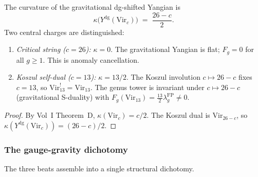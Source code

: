 \begin{proposition}
\label{prop:grav-yangian-curvature}
The curvature of the gravitational dg-shifted Yangian is
\begin{equation}\label{eq:grav-yangian-kappa}
\kappa\bigl(Y^{\mathrm{dg}}(\mathrm{Vir}_c)\bigr)
\;=\;
\frac{26 - c}{2}.
\end{equation}
Two central charges are distinguished:
\begin{enumerate}[label=\textup{(\roman*)}]
\item \emph{Critical string ($c = 26$):}\enspace
$\kappa = 0$. The gravitational Yangian is flat; $F_g = 0$ for all
$g \ge 1$. This is anomaly cancellation.

\item \emph{Koszul self-dual ($c = 13$):}\enspace
$\kappa = 13/2$. The Koszul involution $c \mapsto 26-c$ fixes
$c = 13$, so $\mathrm{Vir}_{13}^! = \mathrm{Vir}_{13}$.
The genus tower is invariant under $c \mapsto 26 - c$
\textup{(}gravitational S-duality\textup{)} with
$F_g(\mathrm{Vir}_{13}) = \frac{13}{2}\lambda_g^{\mathrm{FP}}\neq 0$.
\end{enumerate}
\end{proposition}

\begin{proof}
By Vol~I Theorem~D, $\kappa(\mathrm{Vir}_c) = c/2$. The Koszul
dual is $\mathrm{Vir}_{26-c}$, so
$\kappa(Y^{\mathrm{dg}}(\mathrm{Vir}_c))
= (26-c)/2$.
\end{proof}

\subsubsection*{The gauge-gravity dichotomy}

The three beats assemble into a single structural dichotomy.

